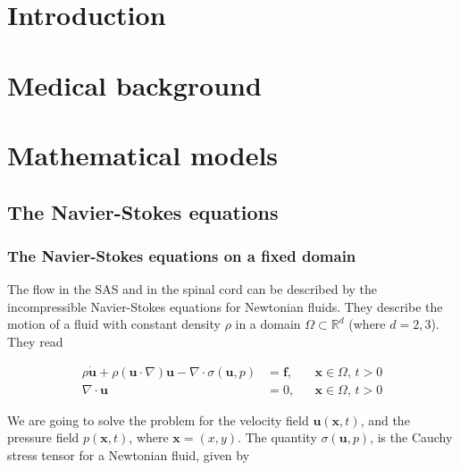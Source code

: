 \documentclass[11pt,a4paper,titlepage]{report}
\begin{document}

\tableofcontents
{}

\newpage


\chapter{Introduction}

\chapter{Medical background}

\chapter{Mathematical models}

\section{The Navier-Stokes equations}


\subsection{The Navier-Stokes equations on a fixed domain}


The flow in the SAS and in the spinal cord can be described by the incompressible Navier-Stokes equations for Newtonian fluids. They describe the motion of a fluid with constant density $\rho$ in a domain $\Omega \subset \mathbb{R}^d$ (where $d=2,3$). They read

\begin{align}
\label{eq:ns:0}
\rho \dot{\mathbf{u}} + \rho (\mathbf{u} \cdot \nabla)\mathbf{u} - \nabla \cdot \sigma(\mathbf{u},p) &= \mathbf{f},  && \mathbf{x} \in \Omega, \, t>0 \\
\nabla \cdot \mathbf{u} &= 0, && \mathbf{x} \in \Omega, \, t>0
\end{align}

We are going to solve the problem for the velocity field $\mathbf{u}(\mathbf{x},t)$, and the pressure field $p(\mathbf{x},t)$, where $\mathbf{x} = (x,y)$. The quantity $\sigma(\mathbf{u}, p)$, is the Cauchy stress tensor for a Newtonian fluid, given by
\end{document}
